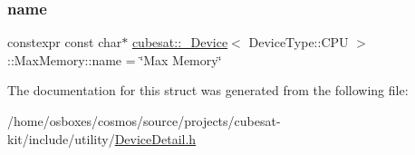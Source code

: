 \subsubsection{\texorpdfstring{name}{name}}
{\footnotesize\ttfamily constexpr const char$\ast$ \hyperlink{structcubesat_1_1__Device}{cubesat\+::\+\_\+\+Device}$<$ Device\+Type\+::\+C\+PU $>$\+::Max\+Memory\+::name = \char`\"{}Max Memory\char`\"{}\hspace{0.3cm}{\ttfamily [static]}}



The documentation for this struct was generated from the following file\+:\begin{DoxyCompactItemize}
\item 
/home/osboxes/cosmos/source/projects/cubesat-\/kit/include/utility/\hyperlink{DeviceDetail_8h}{Device\+Detail.\+h}\end{DoxyCompactItemize}
